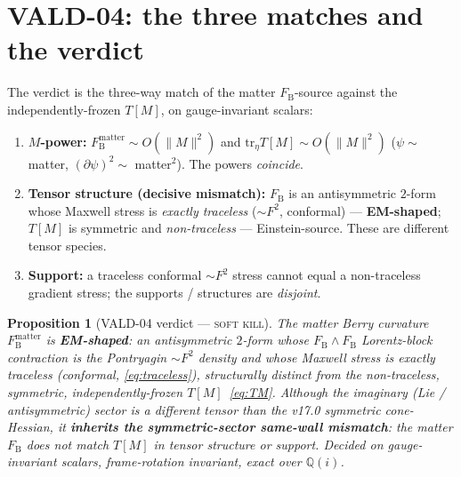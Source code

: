 \documentclass[11pt]{article}
\newcommand{\FB}{F_{\mathrm{B}}}
\theoremstyle{plain}
\newtheorem{proposition}{Proposition}
\theoremstyle{definition}
\begin{document}
\section{VALD-04: the three matches and the verdict}
\label{sec:verdict}

The verdict is the three-way match of the matter $\FB$-source against the
independently-frozen $T[M]$, on gauge-invariant scalars:
\begin{enumerate}
\item \textbf{$M$-power:} $\FB^{\mathrm{matter}}\sim O(\|M\|^2)$ and
  $\mathrm{tr}_\eta T[M]\sim O(\|M\|^2)$ ($\psi\sim$ matter, $(\partial\psi)^2\sim$
  matter$^2$). The powers \emph{coincide}.
\item \textbf{Tensor structure (decisive mismatch):} $\FB$ is an antisymmetric $2$-form
  whose Maxwell stress is \emph{exactly traceless} ($\sim F^2$, conformal) ---
  \textbf{EM-shaped}; $T[M]$ is symmetric and \emph{non-traceless} ---
  Einstein-source. These are different tensor species.
\item \textbf{Support:} a traceless conformal $\sim F^2$ stress cannot equal a
  non-traceless gradient stress; the supports / structures are \emph{disjoint}.
\end{enumerate}

\begin{proposition}[VALD-04 verdict --- \textsc{soft kill}]
\label{prop:verdict}
The matter Berry curvature $\FB^{\mathrm{matter}}$ is \textbf{EM-shaped}: an
antisymmetric $2$-form whose $\FB\wedge\FB$ Lorentz-block contraction is the Pontryagin
$\sim F^2$ density and whose Maxwell stress is exactly traceless (conformal,
\eqref{eq:traceless}), \emph{structurally distinct} from the non-traceless, symmetric,
independently-frozen $T[M]$~\eqref{eq:TM}. Although the imaginary (Lie / antisymmetric)
sector is a \emph{different tensor} than the v17.0 symmetric cone-Hessian, it
\textbf{inherits the symmetric-sector same-wall mismatch}: the matter $\FB$ does not
match $T[M]$ in tensor structure or support. Decided on gauge-invariant scalars,
frame-rotation invariant, exact over $\mathbb{Q}(i)$.
\end{proposition}

\begin{center}\end{center}
\end{document}
